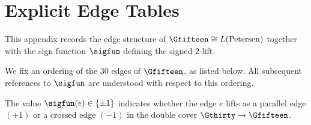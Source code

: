 \section{Explicit Edge Tables}

This appendix records the edge structure of $\Gfifteen \cong L(\mathrm{Petersen})$
together with the sign function $\sigfun$ defining the signed $2$-lift.

We fix an ordering of the $30$ edges of $\Gfifteen$, as listed below.
All subsequent references to $\sigfun$ are understood with respect to
this ordering.

The value $\sigfun(e) \in \{\pm 1\}$ indicates whether the edge $e$
lifts as a parallel edge $(+1)$ or a crossed edge $(-1)$ in the
double cover $\Gthirty \to \Gfifteen$.


